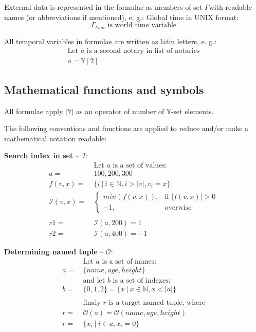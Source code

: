 \documentclass[12pt]{report}
\newcommand{\hlc}[1]{\colorbox{white!25}{#1}}
\begin{document}
External data is represented in the formulae as members of set $\Gamma$with readable names (or abbreviations if mentioned), e. g.: Global time in UNIX format:
\begin{equation}
\Gamma_{time} \ \text{is world time variable}
\end{equation}

All \hlc{temporal} variables in formulae are written as latin letters, e. g.:
\begin{equation}
\begin{aligned}
\text{Let } a \text{ is a second notary in list of notaries} \\
a = \mathbb{Y}[2]
\end{aligned}
\end{equation}

\subsection{Mathematical functions and symbols}
\label{tech-review-math}
All formulae apply $|\mathbb{Y}|$ as an operator of number of $\mathbb{Y}$-set elements.

The following conventions and functions are applied to reduce and/or make a mathematical notation readable:

\textbf{Search index in set} – $\mathcal{I}$:
\begin{align}
&\ \text{Let } a \text{ is a set of values: } \nonumber\\
a =&\ {100, 200, 300} \nonumber\\
f(v, x) =&\ \{i \ | \ i \in \mathbb{N},  i > |v|, v_i = x \} \\
\mathcal{I}(v, x) =&\ \begin{cases}
	min(f(v,x)), & \text{if } |f(v, x)| > 0 \\
	-1, & \text{overwise}
\end{cases}
\\
\\
r1 = &\ \mathcal{I}(a, 200) = 1\nonumber \\
r2 = &\ \mathcal{I}(a, 400) = -1
\end{align}

\textbf{\hlc{Determining} named tuple} – $\mathcal{O}$:
\begin{align}
&\ \text{Let } a \text{ is a set of names: } \nonumber\\
a =&\ \{name, age, height\} \nonumber\\
&\ \text{and let } b \text{ is a set of indexes: } \nonumber\\
b =&\ \{0, 1, 2\} = \{x \ | \ x \in \mathbb{N}, x < |a|\} \\
& \nonumber\\
&\ \text{finaly } r \text{ is a target named tuple, where} \nonumber\\
r =&\ \mathcal{O}(a) = \mathcal{O}(name, age, height) \\ 
r =&\ \{x_i \ | \ i \in  a, x_i = 0 \}
\end{align}
\end{document}
